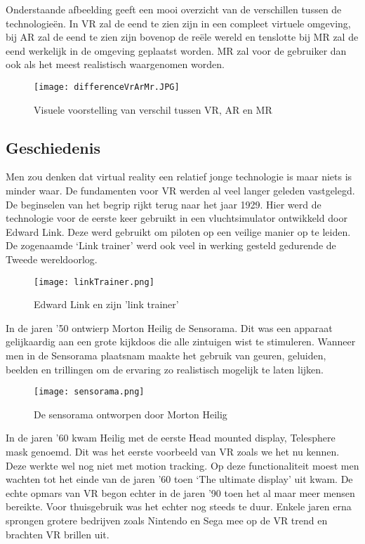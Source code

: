 Onderstaande afbeelding geeft een mooi overzicht van de verschillen tussen de technologieën. In VR zal de eend te zien zijn in een compleet virtuele omgeving, bij AR zal de eend te zien zijn bovenop de reële wereld en tenslotte bij MR zal de eend werkelijk in de omgeving geplaatst worden. MR zal voor de gebruiker dan ook als het meest realistisch waargenomen worden.

\begin{figure}[h]
	\centering
	\texttt{[image: differenceVrArMr.JPG]}
	\caption{Visuele voorstelling van verschil tussen VR, AR en MR}
\end{figure}

\subsection{Geschiedenis}

Men zou denken dat virtual reality een relatief jonge technologie is maar niets is minder waar. De fundamenten voor VR werden al veel langer geleden vastgelegd. De beginselen van het begrip rijkt terug naar het jaar 1929. Hier werd de technologie voor de eerste keer gebruikt in een vluchtsimulator ontwikkeld door Edward Link. Deze werd gebruikt om piloten op een veilige manier op te leiden. De zogenaamde ‘Link trainer’ werd ook veel in werking gesteld gedurende de Tweede wereldoorlog.

\begin{figure}[h]
	\centering
	\texttt{[image: linkTrainer.png]}
	\caption{Edward Link en zijn 'link trainer'}
\end{figure}

In de jaren ’50 ontwierp Morton Heilig de Sensorama. Dit was een apparaat gelijkaardig aan een grote kijkdoos die alle zintuigen wist te stimuleren. Wanneer men in de Sensorama plaatsnam maakte het gebruik van geuren, geluiden, beelden en trillingen om de ervaring zo realistisch mogelijk te laten lijken. 

\begin{figure}[h]
	\centering
	\texttt{[image: sensorama.png]}
	\caption{De sensorama ontworpen door Morton Heilig}
\end{figure}

In de jaren ’60 kwam Heilig met de eerste Head mounted display, Telesphere mask genoemd. Dit was het eerste voorbeeld van VR zoals we het nu kennen. Deze werkte wel nog niet met motion tracking.
Op deze functionaliteit moest men wachten tot het einde van de jaren ’60 toen ‘The ultimate display’ uit kwam.
De echte opmars van VR begon echter in de jaren ’90 toen het al maar meer mensen bereikte. Voor thuisgebruik was het echter nog steeds te duur. Enkele jaren erna sprongen grotere bedrijven zoals Nintendo en Sega mee op de VR trend en brachten VR brillen uit. 


